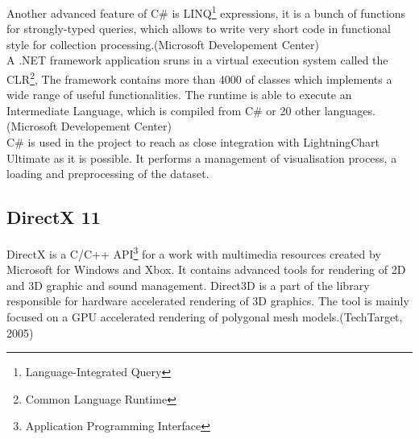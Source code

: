 \documentclass[twoside, english, 11pt]{report}
\begin{document}
Another advanced feature of C\# is  LINQ\footnote{Language-Integrated Query} expressions, it is a bunch of functions for strongly-typed queries, which allows to write very short code in functional style for collection processing.(Microsoft Developement Center)\\

A .NET framework application sruns in a virtual execution system called the CLR\footnote{Common Language Runtime}, The framework contains more than 4000 of classes which implements a wide range of useful functionalities. The runtime is able to execute an Intermediate Language, which is compiled from C\# or 20 other languages.(Microsoft Developement Center)\\

C\# is used in the project to reach as close integration with LightningChart Ultimate as it is possible. It performs a management of visualisation process, a loading and preprocessing of the dataset.

\subsection{DirectX 11}
DirectX is a C/C++ API\footnote{Application Programming Interface} for a work with multimedia resources created by Microsoft for Windows and Xbox. It contains advanced tools for rendering of 2D and 3D graphic and sound management. Direct3D is a part of the library responsible for hardware accelerated rendering of 3D graphics. The tool is mainly focused on a GPU accelerated rendering of polygonal mesh models.(TechTarget, 2005)\\
\end{document}
